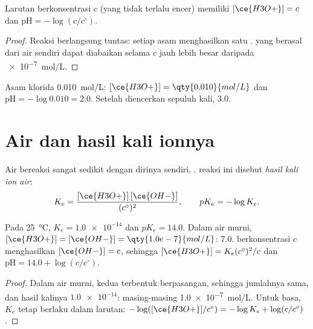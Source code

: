 \begin{proposition}\label{prop:g12:ka-and-pka:strong}
Larutan  berkonsentrasi $c$ (yang tidak terlalu encer) memiliki
$[\ce{H3O+}] = c$ dan $\mathrm{pH} = -\log(c/c^\circ)$.
\end{proposition}

\begin{proof}
Reaksi  berlangsung tuntas: setiap 
asam menghasilkan satu .  yang berasal dari air
sendiri dapat diabaikan selama $c$ jauh lebih besar daripada
\qty{e-7}{mol/L}.
\end{proof}

\begin{example}\label{ex:g12:ka-and-pka:hcl}
Asam klorida \qty{0.010}{mol/L}: $[\ce{H3O+}] = \qty{0.010}{mol/L}$
dan $\mathrm{pH} = -\log 0.010 = 2.0$. Setelah diencerkan sepuluh kali,
 3.0.
\end{example}

\section{Air dan hasil kali ionnya}


\begin{definition}\label{def:g12:ka-and-pka:ionic-product}
Air bereaksi sangat sedikit dengan dirinya sendiri,
.  reaksi ini disebut
\emph{hasil kali ion air}:
\[
  K_e = \frac{[\ce{H3O+}]\,[\ce{OH-}]}{(c^\circ)^2},
  \qquad pK_e = -\log K_e .
\]
\end{definition}

\begin{proposition}\label{prop:g12:ka-and-pka:ke}
Pada \qty{25}{\celsius}, $K_e = \num{1.0e-14}$ dan $pK_e = 14.0$. Dalam
air murni, $[\ce{H3O+}] = [\ce{OH-}] = \qty{1.0e-7}{mol/L}$:  7.0.
 berkonsentrasi $c$ menghasilkan $[\ce{OH-}] = c$, sehingga
$[\ce{H3O+}] = K_e (c^\circ)^2 / c$ dan $\mathrm{pH} = 14.0 + \log(c/c^\circ)$.
\end{proposition}

\begin{proof}
Dalam air murni, kedua  terbentuk berpasangan, sehingga jumlahnya
sama, dan hasil kalinya $\num{1.0e-14}$: masing-masing
\qty{1.0e-7}{mol/L}. Untuk basa, $K_e$ tetap berlaku dalam larutan:
$-\log([\ce{H3O+}]/c^\circ) = -\log K_e + \log(c/c^\circ)$.
\end{proof}

